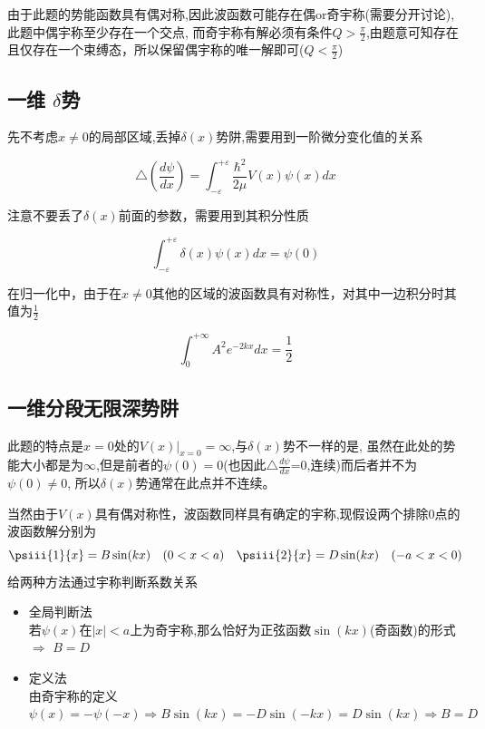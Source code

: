 
            
        
        由于此题的势能函数具有偶对称,因此波函数可能存在偶or奇宇称(需要分开讨论),此题中偶宇称至少存在一个交点,
        而奇宇称有解必须有条件$Q>\frac{\pi}{2}$,由题意可知存在且仅存在一个束缚态，所以保留偶宇称的唯一解即可($Q<\frac{\pi}{2}$)
        
        \subsection{一维 \texorpdfstring{$\delta$}{}势}   %
        
        先不考虑$x\neq0$的局部区域,丢掉$\delta(x)$势阱,需要用到一阶微分变化值的关系    
        
        $$ \triangle(\frac{d\psi}{dx}) = \int_{-\varepsilon}^{+\varepsilon}\frac{\hbar^2}{2\mu}V(x)\psi(x)dx $$     %
        
        注意不要丢了$\delta(x)$前面的参数，需要用到其积分性质
        
        $$\int_{-\varepsilon}^{+\varepsilon} \delta(x) \psi(x) dx =\psi(0) $$
        
        在归一化中，由于在$x\neq 0$其他的区域的波函数具有对称性，对其中一边积分时其值为$\frac{1}{2}$
        
        $$ \int_{0}^{+\infty}A^2 e^{-2kx} dx = \frac{1}{2} $$
        
        
    \subsection{一维分段无限深势阱}
        此题的特点是$x=0$处的$V(x)|_{x=0}=\infty$,与$\delta(x)$势不一样的是,
        虽然在此处的势能大小都是为$\infty$,但是前者的$\psi(0)=0$(也因此$\triangle \frac{d\psi}{dx}$=0,连续)而后者并不为$\psi(0)\neq0$,
        所以$\delta(x)$势通常在此点并不连续。

        当然由于$V(x)$具有偶对称性，波函数同样具有确定的宇称,现假设两个排除0点的波函数解分别为
        $$\psiii{1}{x}=B\sin(kx) \quad (0<x<a) \quad \psiii{2}{x}=D\sin(kx) \quad (-a<x<0)$$
        给两种方法通过宇称判断系数关系
        \begin{itemize}
            \item 全局判断法   \\
                若$\psi(x)$在$|x|<a$上为奇宇称,那么恰好为正弦函数$\sin(kx)$(奇函数)的形式 $\Rightarrow$ $B = D$ 
            \item 定义法    \\
                由奇宇称的定义$\psi(x)=-\psi(-x) \Rightarrow B\sin(kx)=-D\sin(-kx)=D\sin(kx) \Rightarrow B=D$ 
        \end{itemize}
        
